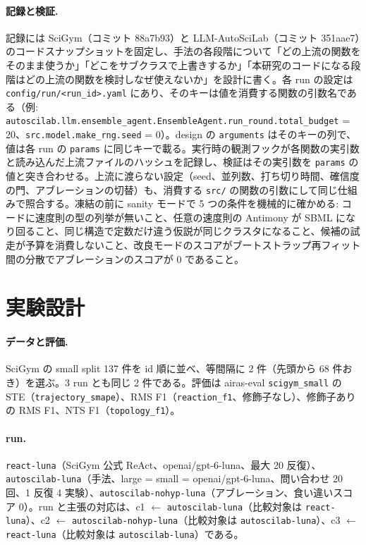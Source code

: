 \documentclass{article}
\begin{document}
\paragraph{記録と検証.}
記録には SciGym（コミット 88a7b93）と LLM-AutoSciLab（コミット 351aae7）のコードスナップショットを固定し、手法の各段階について「どの上流の関数をそのまま使うか」「どこをサブクラスで上書きするか」「本研究のコードになる段階はどの上流の関数を検討しなぜ使えないか」を設計に書く。各 run の設定は \texttt{config/run/<run\_id>.yaml} にあり、そのキーは値を消費する関数の引数名である（例: \texttt{autoscilab.llm.ensemble\_agent.EnsembleAgent.run\_round.total\_budget} = 20、\texttt{src.model.make\_rng.seed} = 0）。design の \texttt{arguments} はそのキーの列で、値は各 run の \texttt{params} に同じキーで載る。実行時の観測フックが各関数の実引数と読み込んだ上流ファイルのハッシュを記録し、検証はその実引数を \texttt{params} の値と突き合わせる。上流に渡らない設定（seed、並列数、打ち切り時間、確信度の門、アブレーションの切替）も、消費する \texttt{src/} の関数の引数にして同じ仕組みで照合する。凍結の前に sanity モードで 5 つの条件を機械的に確かめる: コードに速度則の型の列挙が無いこと、任意の速度則の Antimony が SBML になり回ること、同じ構造で定数だけ違う仮説が同じクラスタになること、候補の試走が予算を消費しないこと、改良モードのスコアがブートストラップ再フィット間の分散でアブレーションのスコアが 0 であること。

\section{実験設計}
\label{sec:design}
\paragraph{データと評価.}
SciGym の small split 137 件を id 順に並べ、等間隔に 2 件（先頭から 68 件おき）を選ぶ。3 run とも同じ 2 件である。評価は airas-eval \texttt{scigym\_small} の STE（\texttt{trajectory\_smape}）、RMS F1（\texttt{reaction\_f1}、修飾子なし）、修飾子ありの RMS F1、NTS F1（\texttt{topology\_f1}）。

\paragraph{run.}
\texttt{react-luna}（SciGym 公式 ReAct、openai/gpt-6-luna、最大 20 反復）、\texttt{autoscilab-luna}（手法、large = small = openai/gpt-6-luna、問い合わせ 20 回、1 反復 4 実験）、\texttt{autoscilab-nohyp-luna}（アブレーション、食い違いスコア 0）。run と主張の対応は、c1 $\leftarrow$ \texttt{autoscilab-luna}（比較対象は \texttt{react-luna}）、c2 $\leftarrow$ \texttt{autoscilab-nohyp-luna}（比較対象は \texttt{autoscilab-luna}）、c3 $\leftarrow$ \texttt{react-luna}（比較対象は \texttt{autoscilab-luna}）である。
\end{document}
